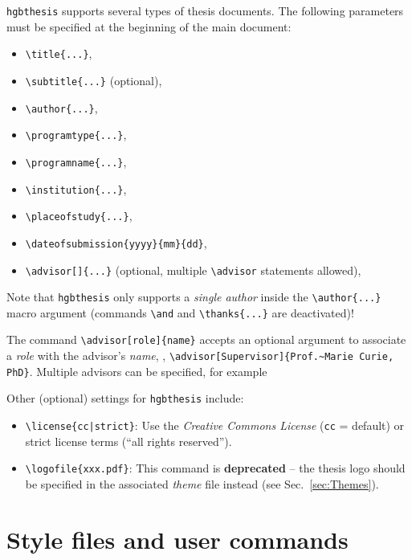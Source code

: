 \documentclass[language=english]{hgbarticle}
\begin{document}
\texttt{hgbthesis} supports several types of thesis documents. The following
parameters must be specified at the beginning of the main document:
%
\begin{itemize}
    \item \verb!\title{...}!,
    \item \verb!\subtitle{...}! (optional),
    \item \verb!\author{...}!,
    \item \verb!\programtype{...}!, 
    \item \verb!\programname{...}!,
    \item \verb!\institution{...}!,
    \item \verb!\placeofstudy{...}!,
    \item \verb!\dateofsubmission{yyyy}{mm}{dd}!,
    \item \verb!\advisor[]{...}! (optional, multiple \verb!\advisor! statements allowed),
\end{itemize}
%
Note that \texttt{hgbthesis} only supports a \emph{single author} inside the
\verb!\author{...}! macro argument (commands \verb!\and! and
\verb!\thanks{...}! are deactivated)!

The command \verb!\advisor[role]{name}! accepts an optional argument to associate a \emph{role} 
with the advisor's \emph{name}, \eg, \verb!\advisor[Supervisor]{Prof.~Marie Curie, PhD}!.
Multiple advisors can be specified, for example
%
\begin{LaTeXCode}[numbers=none]
\end{LaTeXCode}

\noindent
Other (optional) settings for \texttt{hgbthesis} include:
\begin{itemize}
    \item \verb!\license{cc|strict}!:
    Use the \emph{Creative Commons License} (\texttt{cc} = default) or strict license terms
      (``all rights reserved'').
    \item \verb!\logofile{xxx.pdf}!:
		This command is \textbf{deprecated} -- the thesis logo 
		should be specified in the associated \emph{theme} file instead (see Sec.~\ref{sec:Themes}).
\end{itemize}

\section{Style files and user commands}
\end{document}
